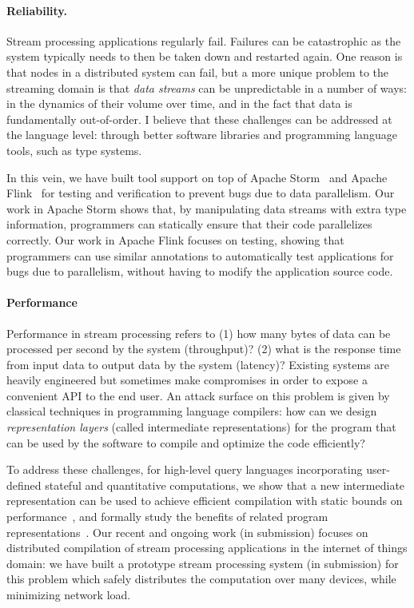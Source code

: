 \documentclass{article}
\begin{document}
\paragraph*{Reliability.}
Stream processing applications regularly fail.
Failures can be catastrophic as the system typically needs to then be
taken down and restarted again.
One reason is that nodes in a distributed system can fail,
but a more unique problem to the streaming domain is that
\emph{data streams} can be unpredictable in a number of ways:
in the dynamics of their volume over time, and in the fact
that data is fundamentally out-of-order.
I believe that these challenges can be addressed at the language level:
through better software libraries and programming language tools, such as type systems.

In this vein, we have built tool support on top of Apache Storm~\cite{pldi19} and Apache Flink~\cite{oopsla20} for testing and verification to prevent bugs due to data parallelism. Our work in Apache Storm shows that, by manipulating data streams with extra type information, programmers can statically ensure that their code parallelizes correctly. Our work in Apache Flink focuses on testing, showing that programmers can use similar annotations to automatically test applications for bugs due to parallelism, without having to modify the application source code.

\paragraph*{Performance}
Performance in stream processing refers to (1) how many bytes of data can be processed per second by the system (throughput)? (2) what is the response time from input data to output data by the system (latency)?
Existing systems are heavily engineered but sometimes make compromises
in order to expose a convenient API to the end user.
An attack surface on this problem is given by classical techniques in programming language compilers: how can we design \emph{representation layers} (called intermediate representations) for the program that can be used by the software to compile and optimize the code efficiently?

To address these challenges,
for high-level query languages incorporating user-defined stateful and quantitative computations, we show that a new intermediate representation can be used to achieve efficient compilation with static bounds on performance~\cite{popl19}, and formally study the benefits of related program representations~\cite{icalp17,tcs20}. Our recent and ongoing work (in submission) focuses on distributed compilation of stream processing applications in the internet of things domain: we have built a prototype stream processing system (in submission) for this problem which safely distributes the computation over many devices, while minimizing network load.
\end{document}
